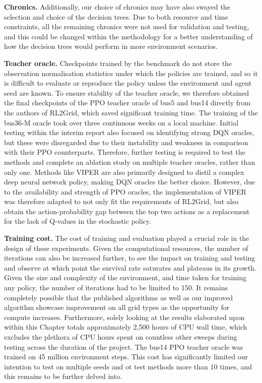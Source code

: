 \textbf{Chronics.} Additionally, our choice of chronics may have also swayed the selection and choice of the decision trees. Due to both resource and time constraints, all the remaining chronics were not used for validation and testing, and this could be changed within the methodology for a better understanding of how the decision trees would perform in more environment scenarios.

\textbf{Teacher oracle.} Checkpoints trained by the benchmark do not store the observation normalisation statistics under which the policies are trained, and so it is difficult to evaluate or reproduce the policy unless the environment and agent seed are known. To ensure stability of the teacher oracle, we therefore obtained the final checkpoints of the PPO teacher oracle of bus5 and bus14 directly from the authors of RL2Grid, which saved significant training time. The training of the bus36-M oracle took over three continuous weeks on a local machine. Initial testing within the interim report also focused on identifying strong DQN oracles, but these were disregarded due to their instability and weakness in comparison with their PPO counterparts. Therefore, further testing is required to test the methods and complete an ablation study on multiple teacher oracles, rather than only one. Methods like VIPER are also primarily designed to distil a complex deep neural network policy, making DQN oracles the better choice. However, due to the availability and strength of PPO oracles, the implementation of VIPER was therefore adapted to not only fit the requirements of RL2Grid, but also obtain the action-probability gap between the top two actions as a replacement for the lack of Q-values in the stochastic policy.

\textbf{Training cost.} The cost of training and evaluation played a crucial role in the design of these experiments. Given the computational resources, the number of iterations can also be increased further, to see the impact on training and testing and observe at which point the survival rate saturates and plateaus in its growth. Given the size and complexity of the environment, and time taken for training any policy, the number of iterations had to be limited to 150. It remains completely possible that the published algorithms as well as our improved algorithm showcase improvement on all grid types as the opportunity for compute increases. Furthermore, solely looking at the results elaborated upon within this Chapter totals approximately 2,500 hours of CPU wall time, which excludes the plethora of CPU hours spent on countless other sweeps during testing across the duration of the project. The bus14 PPO teacher oracle was trained on 45 million environment steps. This cost has significantly limited our intention to test on multiple seeds and ot test methods more than 10 times, and this remains to be further delved into.

